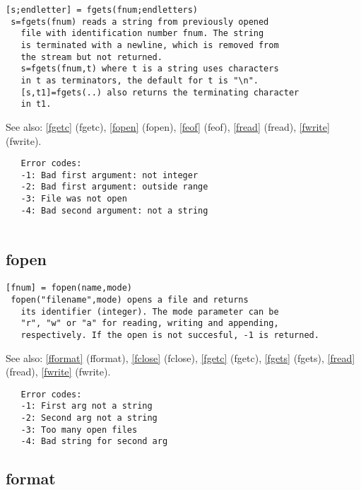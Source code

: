 \documentclass[a4paper]{article}
\begin{document}
\begin{tscreen}
\begin{verbatim}
[s;endletter] = fgets(fnum;endletters)
 s=fgets(fnum) reads a string from previously opened
   file with identification number fnum. The string
   is terminated with a newline, which is removed from
   the stream but not returned.
   s=fgets(fnum,t) where t is a string uses characters
   in t as terminators, the default for t is "\n".
   [s,t1]=fgets(..) also returns the terminating character
   in t1.
\end{verbatim}

See also: \ref{fgetc} {(fgetc)}, \ref{fopen} {(fopen)}, \ref{feof} {(feof)}, \ref{fread} {(fread)}, \ref{fwrite} {(fwrite)}.
\begin{verbatim}
   Error codes:
   -1: Bad first argument: not integer
   -2: Bad first argument: outside range
   -3: File was not open
   -4: Bad second argument: not a string
   
\end{verbatim}
\end{tscreen}



\subsection{fopen\label{fopen}}

\begin{tscreen}
\begin{verbatim}
[fnum] = fopen(name,mode)
 fopen("filename",mode) opens a file and returns
   its identifier (integer). The mode parameter can be
   "r", "w" or "a" for reading, writing and appending,
   respectively. If the open is not succesful, -1 is returned.
\end{verbatim}

See also: \ref{fformat} {(fformat)}, \ref{fclose} {(fclose)}, \ref{fgetc} {(fgetc)}, \ref{fgets} {(fgets)}, \ref{fread} {(fread)}, \ref{fwrite} {(fwrite)}.
\begin{verbatim}
   Error codes:
   -1: First arg not a string
   -2: Second arg not a string
   -3: Too many open files
   -4: Bad string for second arg
\end{verbatim}
\end{tscreen}



\subsection{format\label{format}}
\end{document}
